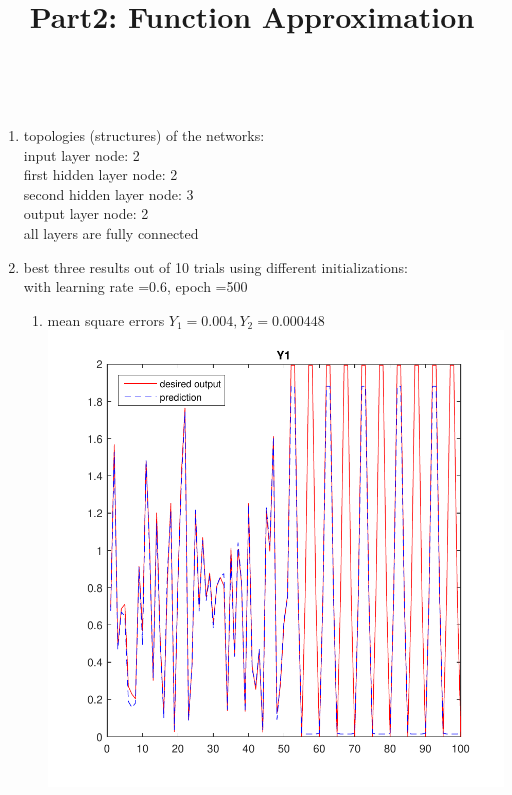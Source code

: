 \documentclass[12pt,a4paper]{article}
\begin{document}
\begin{CJK}{UTF8}{bsmi}
\begin{enumerate}
\begin{enumerate}
\end{enumerate}
\end{enumerate}
\newpage
\title{\large \bf  Part2: Function Approximation}
\\
	\begin{enumerate}
	\item topologies (structures) of the networks: \\
	input layer node: 2 \\
	first hidden layer node: 2 \\
	second hidden layer node: 3 \\
	output layer node: 2\\
	all layers are fully connected
	\item best three results out of 10 trials using different initializations:
	\\
	with learning rate =0.6, epoch =500
	\begin{enumerate}
	\item mean square errors $Y_1= 0.004 , Y_2=0.000448$ \\
	\includegraphics[scale=0.6]{y1} \\

\end{enumerate}
\end{enumerate}
\end{CJK}
\end{document}

